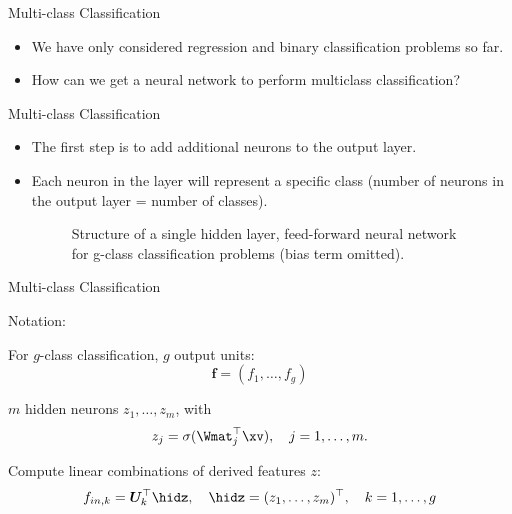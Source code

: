 \begin{frame} {Multi-class Classification}
\vspace{20mm}
\begin{itemize}
\item We have only considered regression and binary classification problems so far.
\vspace{5mm}
\item How can we get a neural network to perform multiclass classification?
  \end{itemize}
\end{frame}

\begin{frame} {Multi-class Classification}
\begin{itemize}
\item The first step is to add additional neurons to the output layer.
\item Each neuron in the layer will represent a specific class (number of neurons in the output layer = number of classes).
\begin{figure}
\centering
{}
\caption{\footnotesize Structure of a single hidden layer, feed-forward neural network for g-class classification problems (bias term omitted).}
\end{figure}
\end{itemize}
\end{frame}

\begin{frame} {Multi-class Classification}
\vspace{5mm}
\begin{blocki}{Notation:}
\item For $g$-class classification, $g$ output units: $$\mathbf{f} = (f_1, \dots, f_g)$$
\vspace{4mm}
\item $m$ hidden neurons $z_1, \dots, z_m$, with
    $$ z_j = \sigma(\Wmat_j^\top \xv), \quad j = 1,\ldots,m. $$
\item Compute linear combinations of derived features $z$:
    $$ f_{in,k} = \bm{U}_k^\top \hidz, \quad \hidz=(z_1,\dots, z_m)^\top, \quad k = 1,\ldots,g$$
\end{blocki}
\end{frame}

